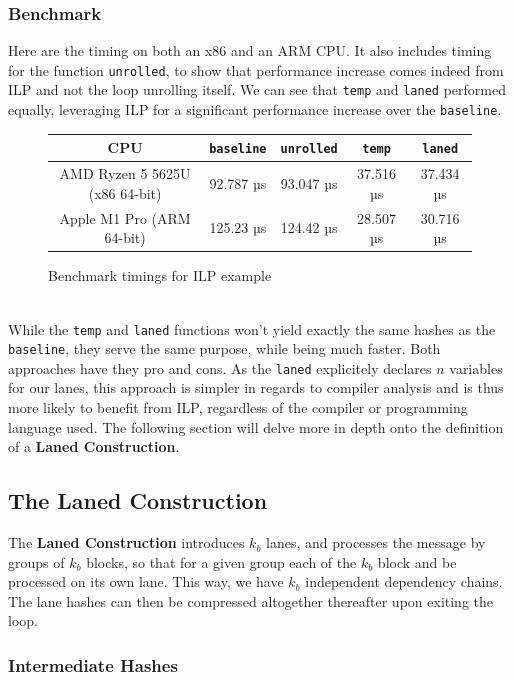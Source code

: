 \documentclass[10pt]{article}
\begin{document}
\clearpage
\subsubsection{Benchmark}
Here are the timing on both an x86 and an ARM CPU. It also includes timing for the function \texttt{unrolled},
to show that performance increase comes indeed from ILP and not the loop unrolling itself.
We can see that \texttt{temp} and \texttt{laned} performed equally, leveraging ILP for a significant performance increase
over the \texttt{baseline}.
\\
\begin{figure}[ht]
\centering
\begin{tabular}{|c|c|c|c|c|}
\hline
CPU & \texttt{baseline} & \texttt{unrolled} & \texttt{temp} & \texttt{laned} \\
\hline
AMD Ryzen 5 5625U (x86 64-bit) & 92.787 µs & 93.047 µs & 37.516 µs & 37.434 µs \\
Apple M1 Pro (ARM 64-bit) & 125.23 µs & 124.42 µs & 28.507 µs & 30.716 µs \\
\hline
\end{tabular}
\caption{Benchmark timings for ILP example}
\label{tab:your_table_label}
\end{figure}
\\
While the \texttt{temp} and \texttt{laned} functions won't yield exactly the same hashes as the \texttt{baseline},
they serve the same purpose, while being much faster.
Both approaches have they pro and cons. As the \texttt{laned} explicitely declares \( n \) variables for our lanes,
this approach is simpler in regards to compiler analysis and is thus more likely to benefit from ILP,
regardless of the compiler or programming language used.
The following section will delve more in depth onto the definition of a \textbf{Laned Construction}.

\clearpage
\subsection{The Laned Construction}

The \textbf{Laned Construction} introduces \( k_b \) lanes, and processes the message by groups of \( k_b \) blocks,
so that for a given group each of the \( k_b \) block and be processed on its own lane.
This way, we have \( k_b \) independent dependency chains. The lane hashes can then be compressed altogether thereafter upon
exiting the loop.

\subsubsection{Intermediate Hashes}
\end{document}
